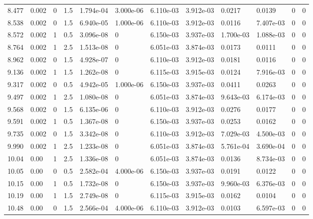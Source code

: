 \documentclass[preview]{standalone}
\begin{document}
{{{\begin{tabular}{L{1.2cm}C{1.2cm} C{0.3cm}C{0.5cm} C{1.4cm}C{1.4cm} C{1.4cm}C{1.4cm} C{1.6cm}C{1.6cm} C{1.6cm}C{1.6cm}}
  8.477  &  0.002  & 0     & 1.5 &  1.794e-04  & 3.000e-06  &  6.110e-03&   3.912e-03& 0.0217 & 0.0139   &  0 & 0  \\ 
  8.538  &  0.002  & 0     & 1.5 &  6.940e-05  & 1.000e-06  &  6.110e-03&   3.912e-03& 0.0116 & 7.407e-03   &  0 & 0  \\ 
  8.572  &  0.002  & 1     & 0.5 &  3.096e-08  & 0  &  6.150e-03&   3.937e-03& 1.700e-03 & 1.088e-03   &  0 & 0  \\ 
  8.764  &  0.002  & 1     & 2.5 &  1.513e-08  & 0  &  6.051e-03&   3.874e-03& 0.0173 & 0.0111   &  0 & 0  \\ 
  8.962  &  0.002  & 0     & 1.5 &  4.928e-07  & 0  &  6.110e-03&   3.912e-03& 0.0181 & 0.0116   &  0 & 0  \\ 
  9.136  &  0.002  & 1     & 1.5 &  1.262e-08  & 0  &  6.115e-03&   3.915e-03& 0.0124 & 7.916e-03   &  0 & 0  \\ 
  9.317  &  0.002  & 0     & 0.5 &  4.942e-05  & 1.000e-06  &  6.150e-03&   3.937e-03& 0.0411 & 0.0263   &  0 & 0  \\ 
  9.497  &  0.002  & 1     & 2.5 &  1.080e-08  & 0  &  6.051e-03&   3.874e-03& 9.643e-03 & 6.174e-03   &  0 & 0  \\ 
  9.568  &  0.002  & 0     & 1.5 &  6.135e-06  & 0  &  6.110e-03&   3.912e-03& 0.0276 & 0.0177   &  0 & 0  \\ 
  9.591  &  0.002  & 1     & 0.5 &  1.367e-08  & 0  &  6.150e-03&   3.937e-03& 0.0253 & 0.0162   &  0 & 0  \\ 
  9.735  &  0.002  & 0     & 1.5 &  3.342e-08  & 0  &  6.110e-03&   3.912e-03& 7.029e-03 & 4.500e-03   &  0 & 0  \\ 
  9.990  &  0.002  & 1     & 2.5 &  1.233e-08  & 0  &  6.051e-03&   3.874e-03& 5.761e-04 & 3.690e-04   &  0 & 0  \\ 
  10.04  &  0.00  & 1     & 2.5 &  1.336e-08  & 0  &  6.051e-03&   3.874e-03& 0.0136 & 8.734e-03   &  0 & 0  \\ 
  10.05  &  0.00  & 0     & 0.5 &  2.582e-04  & 4.000e-06  &  6.150e-03&   3.937e-03& 0.0191 & 0.0122   &  0 & 0  \\ 
  10.15  &  0.00  & 1     & 0.5 &  1.732e-08  & 0  &  6.150e-03&   3.937e-03& 9.960e-03 & 6.376e-03   &  0 & 0  \\ 
  10.19  &  0.00  & 1     & 1.5 &  2.749e-08  & 0  &  6.115e-03&   3.915e-03& 0.0162 & 0.0104   &  0 & 0  \\ 
  10.48  &  0.00  & 0     & 1.5 &  2.566e-04  & 4.000e-06  &  6.110e-03&   3.912e-03& 0.0103 & 6.597e-03   &  0 & 0  \\ 

\end{tabular}}}}
\end{document}
